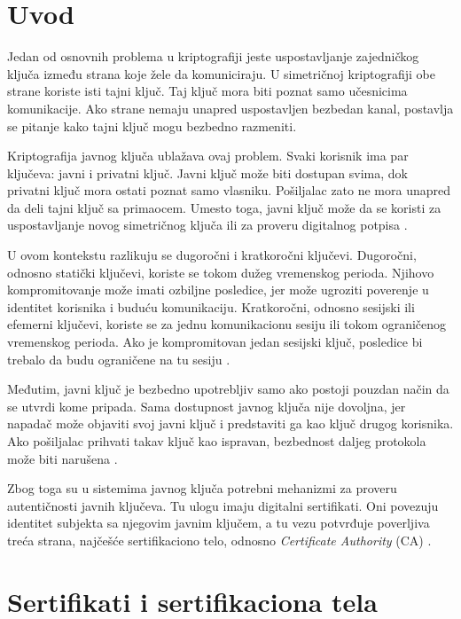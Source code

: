 
\section{Uvod}

Jedan od osnovnih problema u kriptografiji jeste uspostavljanje zajedničkog ključa između strana koje žele da komuniciraju. U simetričnoj kriptografiji obe strane koriste isti tajni ključ. Taj ključ mora biti poznat samo učesnicima komunikacije. Ako strane nemaju unapred uspostavljen bezbedan kanal, postavlja se pitanje kako tajni ključ mogu bezbedno razmeniti.

Kriptografija javnog ključa ublažava ovaj problem. Svaki korisnik ima par ključeva: javni i privatni ključ. Javni ključ može biti dostupan svima, dok privatni ključ mora ostati poznat samo vlasniku. Pošiljalac zato ne mora unapred da deli tajni ključ sa primaocem. Umesto toga, javni ključ može da se koristi za uspostavljanje novog simetričnog ključa ili za proveru digitalnog potpisa \cite{smart2016cryptography}.

U ovom kontekstu razlikuju se dugoročni i kratkoročni ključevi. Dugoročni, odnosno statički ključevi, koriste se tokom dužeg vremenskog perioda. Njihovo kompromitovanje može imati ozbiljne posledice, jer može ugroziti poverenje u identitet korisnika i buduću komunikaciju. Kratkoročni, odnosno sesijski ili efemerni ključevi, koriste se za jednu komunikacionu sesiju ili tokom ograničenog vremenskog perioda. Ako je kompromitovan jedan sesijski ključ, posledice bi trebalo da budu ograničene na tu sesiju \cite{smart2016cryptography}.

Međutim, javni ključ je bezbedno upotrebljiv samo ako postoji pouzdan način da se utvrdi kome pripada. Sama dostupnost javnog ključa nije dovoljna, jer napadač može objaviti svoj javni ključ i predstaviti ga kao ključ drugog korisnika. Ako pošiljalac prihvati takav ključ kao ispravan, bezbednost daljeg protokola može biti narušena \cite{smart2016cryptography}.

Zbog toga su u sistemima javnog ključa potrebni mehanizmi za proveru autentičnosti javnih ključeva. Tu ulogu imaju digitalni sertifikati. Oni povezuju identitet subjekta sa njegovim javnim ključem, a tu vezu potvrđuje poverljiva treća strana, najčešće sertifikaciono telo, odnosno \emph{Certificate Authority} (CA) \cite{smart2016cryptography,rfc5280}.

\section{Sertifikati i sertifikaciona tela}

